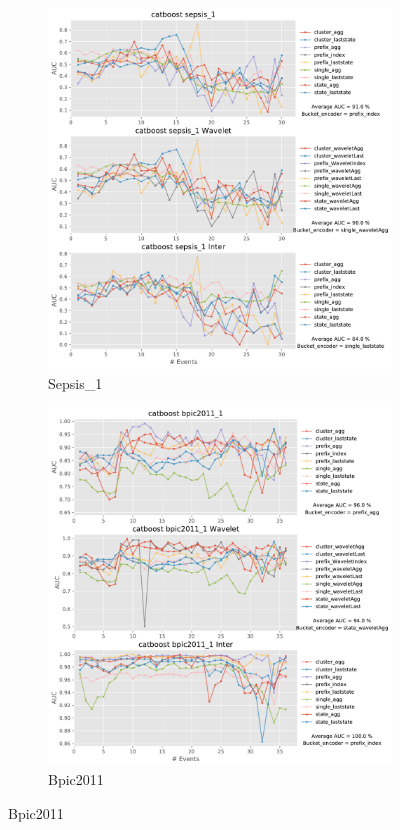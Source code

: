 \documentclass[twoside,11pt]{Latex/Classes/PhDthesisPSnPDF}
\begin{document}
\begin{figure}[!htbp] %

	\begin{subfigure}{0.48\textwidth}
		\includegraphics[width=\linewidth]{images/inter/catboost/sepsis_1.pdf}
		
		\caption{Sepsis\_1} \label{fig:sepsisi}
	\end{subfigure}\hspace*{\fill}
	\begin{subfigure}{0.48\textwidth}
		\includegraphics[width=\linewidth]{images/inter/catboost/bpic2011_1.pdf}
		\caption{Bpic2011} \label{fig:b11i}
	\end{subfigure}
	

\end{figure}
\end{document}
